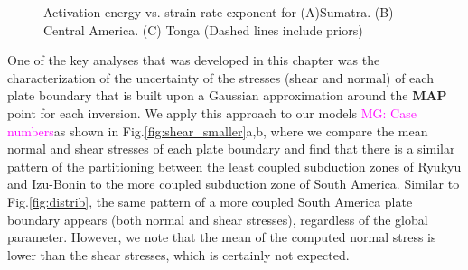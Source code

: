 \documentclass[12pt]{article}
\newcommand{\mgnote}[1]{\textcolor{magenta}{MG: #1}}
\begin{document}
{\begin{figure}[H]
\centering
\hspace{-0.85cm}
\hspace{-0.1cm}
\hspace{-0.1cm}
 

\caption{Activation energy vs. strain rate exponent for (A)Sumatra. 
(B) Central America. 
(C) Tonga (Dashed lines include priors)}
\label{fig:activ_distrib}
\end{figure}


One of the key analyses that was developed in this chapter was the characterization of the uncertainty of the stresses (shear and normal) of each plate boundary that is built upon a Gaussian approximation around the \textbf{MAP} point for each inversion. We apply this approach to our models \mgnote{Case numbers}as shown in Fig.\ref{fig:shear_smaller}a,b, where we compare the mean normal and shear stresses of each plate boundary and find that there is a similar pattern of the partitioning between the least coupled subduction zones of Ryukyu and Izu-Bonin to the more coupled subduction zone of South America. Similar to Fig.\ref{fig:distrib}, the same pattern of a more coupled South America plate boundary appears (both normal and shear stresses), regardless of the global parameter. However, we note that the mean of the computed normal stress is lower than the shear stresses, which is certainly not expected.



}
\end{document}
